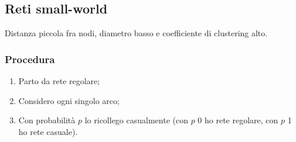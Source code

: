 \documentclass{article}
\begin{document}
  \subsection{Reti small-world}
    Distanza piccola fra nodi, diametro basso e coefficiente di clustering alto.
    \subsubsection{Procedura}
      \begin{enumerate}
          \item Parto da rete regolare;
          \item Considero ogni singolo arco;
          \item Con probabilità $p$ lo ricollego casualmente (con $p$ 0 ho rete regolare, con $p$ 1 ho rete casuale).
      \end{enumerate}
\end{document}
